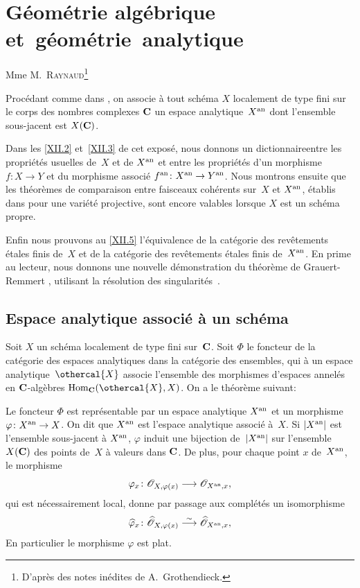 \chapter{G\'eom\'etrie alg\'ebrique et~g\'eom\'etrie~analytique}
\label{XII}

\begin{center}
{Mme M.\ \textsc{Raynaud}\footnote{D'apr\`es des notes in\'edites de
A.\, Grothendieck.}}
\end{center}
\vspace*{1cm}

Proc\'edant comme dans \cite{XII.10}, on associe \`a tout sch\'ema $X$
localement de type fini sur le corps des nombres complexes $\mathbf{C}$ un
espace analytique~$X^{\mathrm{an}}$
\label{indnot:lb}dont l'ensemble sous-jacent est $X(\mathbf{C})$.

Dans les \No \ref{XII.2} et~\ref{XII.3} de cet expos\'e, nous donnons un
\og dictionnaire\fg entre les propri\'et\'es usuelles de~$X$ et de
$X^{\mathrm{an}}$ et entre les propri\'et\'es d'un morphisme $f\colon X\to
Y$ et du morphisme associ\'e $f^\an\colon X^\an \to Y^\an$.
\label{indnot:lc}
Nous montrons ensuite que les th\'eor\`emes de comparaison entre
faisceaux coh\'erents sur~$X$ et $X^{\mathrm{an}}$, \'etablis dans \cite[]{XII.10} pour une vari\'et\'e projective, sont encore valables lorsque
$X$ est un sch\'ema propre.

Enfin nous prouvons au \No \ref{XII.5} l'\'equivalence de la cat\'egorie des
rev\^etements \'etales finis de~$X$ et de la cat\'egorie des
rev\^etements \'etales finis de~$X^{\mathrm{an}}$. En prime au lecteur, nous
donnons une nouvelle d\'emonstration du th\'eor\`eme de
Grauert-Remmert \cite{XII.6}, utilisant la r\'esolution des
singularit\'es~\cite{XII.8}.

\section{Espace analytique associ\'e \`a un sch\'ema}
\label{XII.1}

Soit $X$ un sch\'ema localement de type fini sur~$\mathbf{C}$. Soit $\Phi$
le foncteur de la cat\'egorie des espaces analytiques \cite[]{XII.4} dans
la cat\'egorie des ensembles, qui \`a un espace analytique~$\othercal{X}$ associe l'ensemble des morphismes d'espaces annel\'es en
$\mathbf{C}$-alg\`ebres $\Hom_\CC (\othercal{X},X)$. On a le th\'eor\`eme
suivant:

\begin{theoremedefinition}
\label{XII.1.1} Le foncteur $\Phi$ est repr\'esentable par un
espace analytique $X^{\mathrm{an}}$ et un morphisme $\varphi\colon X^\an\to
X$. On dit que $X^{\mathrm{an}}$ est l'espace analytique associ\'e \`a~$X$.
Si $|X^{\mathrm{an}}|$ est l'ensemble sous-jacent \`a $X^{\mathrm{an}}$, $\varphi$
induit une bijection de~$|X^{\mathrm{an}}|$ sur l'ensemble $X(\mathbf{C})$ des points
de~$X$ \`a valeurs dans $\mathbf{C}$. De plus, pour chaque point $x$ de~$X^{\mathrm{an}}$, le morphisme
$$
\varphi_x\colon\cal{O}_{X,\varphi(x)}\to\cal{O}_{X^\an,x},
$$
qui est n\'ecessairement local, donne par passage aux
compl\'et\'es un isomorphisme
$$
\widehat{\varphi}_x\colon\widehat{\cal{O}}_{X,\varphi(x)}\isomto
\widehat{\cal{O}}_{X^\an,x},
$$
En particulier le morphisme $\varphi$ est plat.
\end{theoremedefinition}


